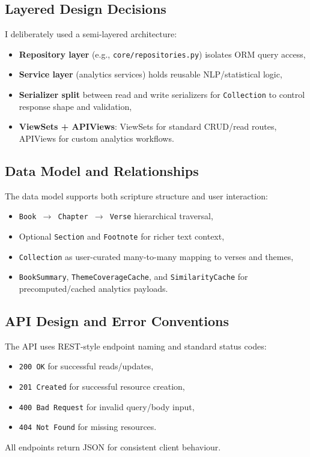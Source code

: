 \documentclass[11pt,a4paper]{article}
\begin{document}
\subsection{Layered Design Decisions}
I deliberately used a semi-layered architecture:
\begin{itemize}[leftmargin=*]
	\item \textbf{Repository layer} (e.g., \texttt{core/repositories.py}) isolates ORM query access,
	\item \textbf{Service layer} (analytics services) holds reusable NLP/statistical logic,
	\item \textbf{Serializer split} between read and write serializers for \texttt{Collection} to control response shape and validation,
	\item \textbf{ViewSets + APIViews}: ViewSets for standard CRUD/read routes, APIViews for custom analytics workflows.
\end{itemize}

\subsection{Data Model and Relationships}
The data model supports both scripture structure and user interaction:
\begin{itemize}[leftmargin=*]
	\item \texttt{Book $\rightarrow$ Chapter $\rightarrow$ Verse} hierarchical traversal,
	\item Optional \texttt{Section} and \texttt{Footnote} for richer text context,
	\item \texttt{Collection} as user-curated many-to-many mapping to verses and themes,
	\item \texttt{BookSummary}, \texttt{ThemeCoverageCache}, and \texttt{SimilarityCache} for precomputed/cached analytics payloads.
\end{itemize}

\subsection{API Design and Error Conventions}
The API uses REST-style endpoint naming and standard status codes:
\begin{itemize}[leftmargin=*]
	\item \texttt{200 OK} for successful reads/updates,
	\item \texttt{201 Created} for successful resource creation,
	\item \texttt{400 Bad Request} for invalid query/body input,
	\item \texttt{404 Not Found} for missing resources.
\end{itemize}
All endpoints return JSON for consistent client behaviour.
\end{document}

